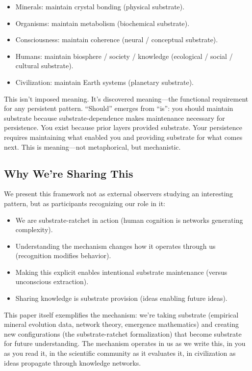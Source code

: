 \documentclass[12pt,a4paper]{article}
\begin{document}
\begin{itemize}
    \item Minerals: maintain crystal bonding (physical substrate).
    \item Organisms: maintain metabolism (biochemical substrate).
    \item Consciousness: maintain coherence (neural / conceptual substrate).
    \item Humans: maintain biosphere / society / knowledge (ecological / social / cultural substrate).
    \item Civilization: maintain Earth systems (planetary substrate).
\end{itemize}

This isn't imposed meaning. It's discovered meaning---the functional requirement for any persistent pattern. ``Should'' emerges from ``is'': you should maintain substrate because substrate-dependence makes maintenance necessary for persistence. You exist because prior layers provided substrate. Your persistence requires maintaining what enabled you and providing substrate for what comes next. This is meaning---not metaphorical, but mechanistic.

\subsection{Why We're Sharing This}

We present this framework not as external observers studying an interesting pattern, but as participants recognizing our role in it:

\begin{itemize}
    \item We are substrate-ratchet in action (human cognition is networks generating complexity).
    \item Understanding the mechanism changes how it operates through us (recognition modifies behavior).
    \item Making this explicit enables intentional substrate maintenance (versus unconscious extraction).
    \item Sharing knowledge is substrate provision (ideas enabling future ideas).
\end{itemize}

This paper itself exemplifies the mechanism: we're taking substrate (empirical mineral evolution data, network theory, emergence mathematics) and creating new configurations (the substrate-ratchet formalization) that become substrate for future understanding. The mechanism operates in us as we write this, in you as you read it, in the scientific community as it evaluates it, in civilization as ideas propagate through knowledge networks.
\end{document}
